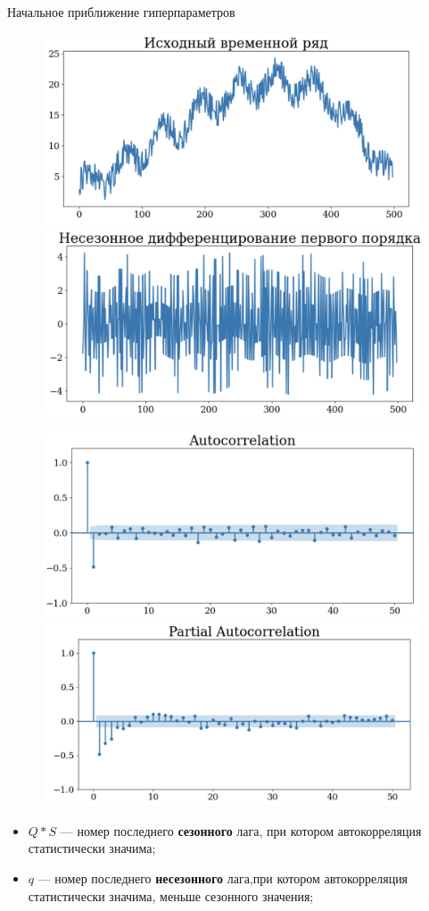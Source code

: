 \begin{frame}{Начальное приближение гиперпараметров}
\begin{figure}
    \centering
    \includegraphics[width=0.45\linewidth]{lecture_3/fig/2_ts_init.png}
    \includegraphics[width=0.45\linewidth]{lecture_3/fig/2_dts_init.png}
\end{figure}
\begin{figure}
    \centering
    \includegraphics[width=0.45\linewidth]{lecture_3/fig/2_autocorr.png}
    \includegraphics[width=0.45\linewidth]{lecture_3/fig/2_pautocorr.png}
\end{figure}

\begin{itemize}
    \item $Q*S$ --- номер последнего \textbf{сезонного} лага, при котором автокорреляция статистически значима;
    \item $q$ --- номер последнего \textbf{несезонного} лага,при котором автокорреляция статистически значима, меньше сезонного значения;
\end{itemize}

\end{frame}
